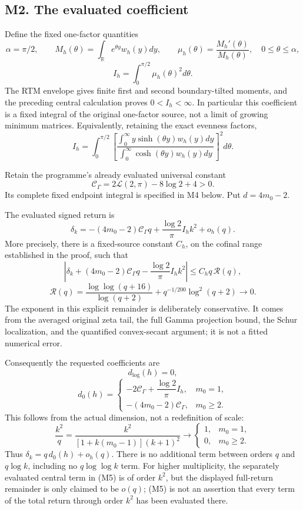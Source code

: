 \documentclass[
  11pt,
]{article}
\begin{document}
\subsection{M2. The evaluated
coefficient}\label{m2.-the-evaluated-coefficient}

Define the fixed one-factor quantities \[
\alpha=\pi/2,\qquad M_h(\theta)=\int_{\mathbb R}e^{\theta y}w_h(y)dy,
\qquad \mu_h(\theta)=\frac{M_h'(\theta)}{M_h(\theta)},
\quad0\le\theta\le\alpha,
\] \[
\boxed{I_h=\int_0^{\pi/2}\mu_h(\theta)^2d\theta.}\tag{M2}
\] The RTM envelope gives finite first and second boundary-tilted
moments, and the preceding central calculation proves \(0<I_h<\infty\).
In particular this coefficient is a fixed integral of the original
one-factor source, not a limit of growing minimum matrices.
Equivalently, retaining the exact evenness factors, \[
I_h=\int_0^{\pi/2}
\left[
\frac{\int_0^\infty y\sinh(\theta y)w_h(y)dy}
{\int_0^\infty \cosh(\theta y)w_h(y)dy}
\right]^2d\theta.
\tag{M3}
\]

Retain the programme's already evaluated universal constant \[
\boxed{\mathcal C_\Gamma=2\mathcal L(2,\pi)-8\log2+4>0.}\tag{M4}
\] Its complete fixed endpoint integral is specified in M4 below. Put
\(d=4m_0-2\).

The evaluated signed return is \[
\boxed{\delta_k
=-(4m_0-2)\mathcal C_\Gamma q
+\frac{\log2}{\pi}I_h k^2+o_h(q).}\tag{M5}
\] More precisely, there is a fixed-source constant \(C_h\), on the
cofinal range established in the proof, such that \[
\boxed{
\left|\delta_k+(4m_0-2)\mathcal C_\Gamma q
-\frac{\log2}{\pi}I_h k^2\right|
\le C_hq\,\mathscr R(q),
}\tag{M6}
\] \[
\mathscr R(q)=
\frac{\log\log(q+16)}{\log(q+2)}
+q^{-1/200}\log^2(q+2)
\longrightarrow0.
\] The exponent in this explicit remainder is deliberately conservative.
It comes from the averaged original zeta tail, the full Gamma projection
bound, the Schur localization, and the quantified convex-secant
argument; it is not a fitted numerical error.

Consequently the requested coefficients are \[
\boxed{d_{\log}(h)=0,}\tag{M7}
\] \[
\boxed{
 d_0(h)=
 \begin{cases}
 -2\mathcal C_\Gamma+\dfrac{\log2}{\pi}I_h,&m_0=1,\\[5pt]
 -(4m_0-2)\mathcal C_\Gamma,&m_0\ge2.
 \end{cases}}
\tag{M8}
\] This follows from the actual dimension, not a redefinition of scale:
\[
\frac{k^2}{q}=
\frac{k^2}{[1+k(m_0-1)](k+1)^2}
\longrightarrow
\begin{cases}1,&m_0=1,\\0,&m_0\ge2.\end{cases}
\] Thus \(\delta_k=q\,d_0(h)+o_h(q)\). There is no additional term
between orders \(q\) and \(q\log k\), including no \(q\log\log k\) term.
For higher multiplicity, the separately evaluated central term in (M5)
is of order \(k^2\), but the displayed full-return remainder is only
claimed to be \(o(q)\); (M5) is not an assertion that every term of the
total return through order \(k^2\) has been evaluated there.
\end{document}
